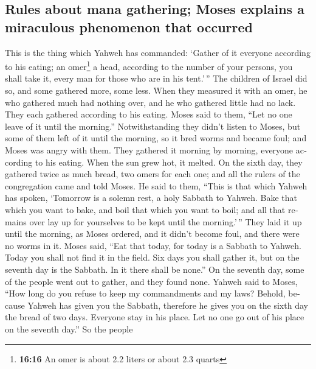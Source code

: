 \begin{paracol}{2}
\begin{otherlanguage}{english}
\hypertarget{rules-about-mana-gathering-moses-explains-a-miraculous-phenomenon-that-occurred}{%
\subsection{Rules about mana gathering; Moses explains a miraculous
phenomenon that
occurred}\label{rules-about-mana-gathering-moses-explains-a-miraculous-phenomenon-that-occurred}}

 This is the thing which Yahweh has commanded: `Gather of
it everyone according to his eating; an omer\footnote{\textbf{16:16} An
  omer is about 2.2 liters or about 2.3 quarts} a head, according to the
number of your persons, you shall take it, every man for those who are
in his tent.'\,''  The children of Israel did so, and
some gathered more, some less.  When they measured it
with an omer, he who gathered much had nothing over, and he who gathered
little had no lack. They each gathered according to his eating.
 Moses said to them, ``Let no one leave of it until the
morning.''  Notwithstanding they didn't listen to Moses,
but some of them left of it until the morning, so it bred worms and
became foul; and Moses was angry with them.  They
gathered it morning by morning, everyone according to his eating. When
the sun grew hot, it melted.  On the sixth day, they
gathered twice as much bread, two omers for each one; and all the rulers
of the congregation came and told Moses.  He said to
them, ``This is that which Yahweh has spoken, `Tomorrow is a solemn
rest, a holy Sabbath to Yahweh. Bake that which you want to bake, and
boil that which you want to boil; and all that remains over lay up for
yourselves to be kept until the morning.'\,''  They laid
it up until the morning, as Moses ordered, and it didn't become foul,
and there were no worms in it.  Moses said, ``Eat that
today, for today is a Sabbath to Yahweh. Today you shall not find it in
the field.  Six days you shall gather it, but on the
seventh day is the Sabbath. In it there shall be none.'' 
On the seventh day, some of the people went out to gather, and they
found none.  Yahweh said to Moses, ``How long do you
refuse to keep my commandments and my laws?  Behold,
because Yahweh has given you the Sabbath, therefore he gives you on the
sixth day the bread of two days. Everyone stay in his place. Let no one
go out of his place on the seventh day.''  So the people

\end{otherlanguage}
\end{paracol}
